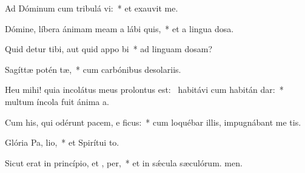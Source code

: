 \item Ad Dóminum cum tribulá vi:~* et exauvit me.
\item Dómine, líbera ánimam meam a lábi quis,~* et a lingua dosa.
\item Quid detur tibi, aut quid appo bi~* ad linguam dosam?
\item Sagíttæ potén tæ,~* cum carbónibus desolariis.
\item Heu mihi! quia incolátus meus prolontus est:~\pscross{} habitávi cum habitán dar:~* multum íncola fuit ánima a.
\item Cum his, qui odérunt pacem, e ficus:~* cum loquébar illis, impugnábant me tis.
\item Glória Pa,  lio,~* et Spirítui to.
\item Sicut erat in princípio, et ,  per,~* et in sǽcula sæculórum. men.

